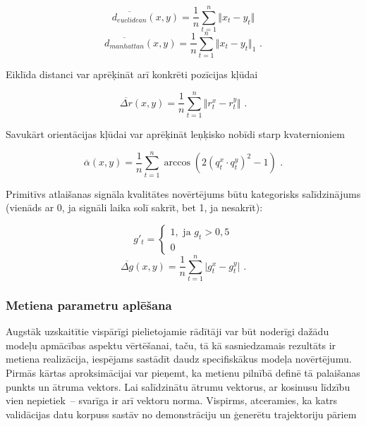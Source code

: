 \documentclass[12pt, a4paper]{article}
\numberwithin{equation}{section} %
\begin{document}
\begin{equation}
    \overline{d_{euclidean}}(x,y) = \frac{1}{n} \sum_{t=1}^{n} \Vert x_t - y_t \Vert
\end{equation}
\begin{equation}
    \overline{d_{manhattan}}(x,y) = \frac{1}{n} \sum_{t=1}^{n} \Vert x_t - y_t \Vert_1
\text{ .}
\end{equation}

Eiklīda distanci var aprēķināt arī konkrēti pozīcijas kļūdai

\begin{equation}
    \overline{\Delta r}(x,y) = \frac{1}{n} \sum_{t=1}^{n} \Vert r^x_t - r^y_t \Vert
\text{ .}
\end{equation}

Savukārt orientācijas kļūdai var aprēķināt leņķisko nobīdi starp kvaternioniem \cite{quat_distance}

\begin{equation}
    \overline{\alpha}(x,y) = \frac{1}{n} \sum_{t=1}^{n} \arccos \left (2(q^x_t \cdot q^y_t)^2 - 1 \right )
\text{ .}
\end{equation}

Primitīvs atlaišanas signāla kvalitātes novērtējums būtu kategorisks salīdzinājums (vienāds ar 0, ja signāli laika solī sakrīt, bet 1, ja nesakrīt):

\begin{equation}
    g'_t = 
    \begin{cases}
        1, \text{ ja } g_t > 0,5 \\
        0
    \end{cases}
\end{equation}
\begin{equation}
    \overline{\Delta g}(x,y) = \frac{1}{n} \sum_{t=1}^{n} \vert g^x_t - g^y_t \vert
    \text{ .}
\end{equation}

\subsubsection{Metiena parametru aplēšana}

Augstāk uzskaitītie vispārīgi pielietojamie rādītāji var būt noderīgi dažādu modeļu apmācības aspektu vērtēšanai, taču, tā kā sasniedzamais rezultāts ir metiena realizācija, iespējams sastādīt daudz specifiskākus modeļa novērtējumu. Pirmās kārtas aproksimācijai var pieņemt, ka metienu pilnībā definē tā palaišanas punkts un ātruma vektors. Lai salīdzinātu ātrumu vektorus, ar kosinusu līdzību vien nepietiek~-- svarīga ir arī vektoru norma. Vispirms, atceramies, ka katrs validācijas datu korpuss sastāv no demonstrāciju un ģenerētu trajektoriju pāriem
\end{document}
